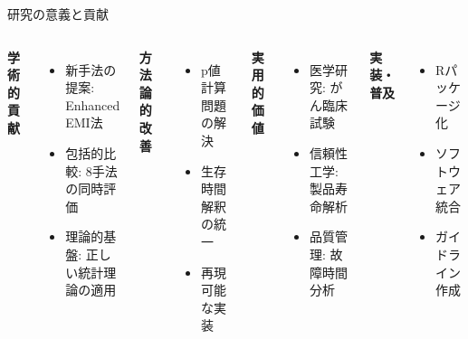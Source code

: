 \documentclass[11pt,aspectratio=169]{beamer}
\begin{document}
\begin{frame}{研究の意義と貢献}
\begin{columns}
\textbf{学術的貢献}
\begin{itemize}
\item \textcolor{primary}{新手法の提案}: Enhanced EMI法
\item \textcolor{primary}{包括的比較}: 8手法の同時評価
\item \textcolor{primary}{理論的基盤}: 正しい統計理論の適用
\end{itemize}

\vspace{1em}
\textbf{方法論的改善}
\begin{itemize}
\item p値計算問題の解決
\item 生存時間解釈の統一
\item 再現可能な実装
\end{itemize}

\textbf{実用的価値}
\begin{itemize}
\item \textcolor{secondary}{医学研究}: がん臨床試験
\item \textcolor{secondary}{信頼性工学}: 製品寿命解析
\item \textcolor{secondary}{品質管理}: 故障時間分析
\end{itemize}

\vspace{1em}
\textbf{実装・普及}
\begin{itemize}
\item Rパッケージ化
\item ソフトウェア統合
\item ガイドライン作成
\end{itemize}
\end{columns}
\end{frame}
\end{document}
